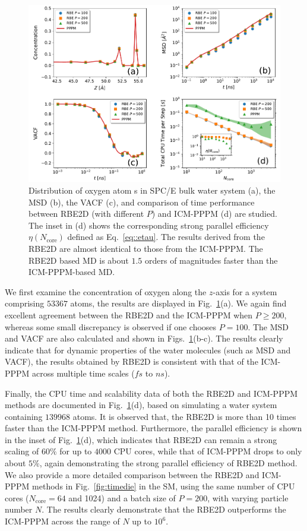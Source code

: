 \begin{figure}[ht]
\centering
\includegraphics[width=1.0\linewidth]{figs/Dielectric.pdf}
    \caption{Distribution of oxygen atom {s} in SPC/E bulk water system (a), the MSD (b), the VACF (c), and comparison of time performance between RBE2D (with different $P$) and ICM-PPPM (d) are studied. 
    The inset in (d) shows  {the} corresponding strong parallel efficiency $\eta(N_{\text{core}})$ defined as Eq.~\eqref{eq::etau}. 
    The results derived from the RBE2D   {are} almost identical to those from the ICM-PPPM. 
     {The RBE2D based MD is about $1.5$ orders of magnitudes faster than the ICM-PPPM-based MD.}
    }
    \label{fig:den2}
\end{figure}

We first examine the concentration of oxygen along  {the} $z$-axis for a system comprising $53367$ atoms, the results are displayed in Fig.~\ref{fig:den2}(a). 
We again find  excellent agreement between the RBE2D and the ICM-PPPM when $P\geq 200$, whereas some small discrepancy is observed if one chooses $P=100$. 
The MSD and VACF are also calculated and shown in Figs.~\ref{fig:den2}(b-c).
The results clearly indicate that for dynamic properties of the water molecules (such as MSD and VACF), the results obtained by RBE2D is consistent   {with} that of the ICM-PPPM  {across} multiple time scales ($fs$ to $ns$). 

Finally, the CPU time and scalability data of both the RBE2D and ICM-PPPM methods are documented in Fig.~\ref{fig:den2}(d), based on simulating a water system containing $139968$ atoms. It is observed that, the RBE2D is more than 10 times faster than the ICM-PPPM method. 
Furthermore, the   {parallel efficiency} is shown in the inset of Fig.~\ref{fig:den2}(d), which indicates that RBE2D can remain a strong scaling of $60\%$ for up to $4000$ CPU cores, while that of ICM-PPPM drops to only about $5\%$, again demonstrating the strong   {parallel efficiency} of RBE2D method.  {We also provide a more detailed comparison between the RBE2D and ICM-PPPM methods in Fig.~\ref{fig:timedie} in the SM, using the same number of CPU cores (\( N_{\text{core}} = 64 \) and 1024) and a batch size of \( P = 200 \), with varying particle number $N$. 
The results clearly demonstrate that the RBE2D outperforms the ICM-PPPM across the range of \( N \) up to \( 10^6 \).}

